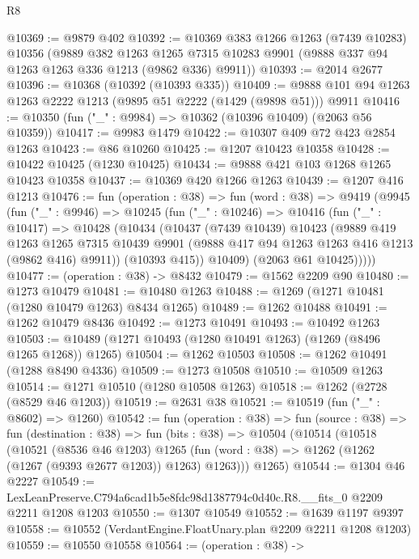 \begin{lexlean}{R8}
\begin{coremodule}
@10369 := @9879 @402
@10392 := @10369
    @383
    @1266
    @1263
    (@7439 @10283)
    @10356
    (@9889
      @382
      @1263
      @1265
      @7315
      @10283
      @9901
      (@9888 @337 @94 @1263 @1263 @336 @1213 (@9862 @336) @9911))
@10393 := @2014 @2677
@10396 := @10368 (@10392 (@10393 @335))
@10409 := @9888 @101 @94 @1263 @1263 @2222 @1213 (@9895 @51 @2222 (@1429 (@9898 @51))) @9911
@10416 := @10350 (fun ("_" : @9984) => @10362 (@10396 @10409) (@2063 @56 @10359))
@10417 := @9983 @1479
@10422 := @10307 @409 @72 @423 @2854 @1263
@10423 := @86 @10260
@10425 := @1207 @10423 @10358
@10428 := @10422 @10425 (@1230 @10425)
@10434 := @9888 @421 @103 @1268 @1265 @10423 @10358
@10437 := @10369 @420 @1266 @1263
@10439 := @1207 @416 @1213
@10476 := fun (operation : @38) =>
  fun (word : @38) =>
  @9419
    (@9945
      (fun ("_" : @9946) =>
      @10245
        (fun ("_" : @10246) =>
        @10416
          (fun ("_" : @10417) =>
          @10428
            (@10434
              (@10437
                (@7439 @10439)
                @10423
                (@9889
                  @419
                  @1263
                  @1265
                  @7315
                  @10439
                  @9901
                  (@9888 @417 @94 @1263 @1263 @416 @1213 (@9862 @416) @9911))
                (@10393 @415))
              @10409)
            (@2063 @61 @10425)))))
@10477 := (operation : @38) -> @8432
@10479 := @1562 @2209 @90
@10480 := @1273 @10479
@10481 := @10480 @1263
@10488 := @1269 (@1271 @10481 (@1280 @10479 @1263) @8434 @1265)
@10489 := @1262 @10488
@10491 := @1262 @10479 @8436
@10492 := @1273 @10491
@10493 := @10492 @1263
@10503 := @10489 (@1271 @10493 (@1280 @10491 @1263) (@1269 (@8496 @1265 @1268)) @1265)
@10504 := @1262 @10503
@10508 := @1262 @10491 (@1288 @8490 @4336)
@10509 := @1273 @10508
@10510 := @10509 @1263
@10514 := @1271 @10510 (@1280 @10508 @1263)
@10518 := @1262 (@2728 (@8529 @46 @1203))
@10519 := @2631 @38
@10521 := @10519 (fun ("_" : @8602) => @1260)
@10542 := fun (operation : @38) =>
  fun (source : @38) =>
  fun (destination : @38) =>
  fun (bits : @38) =>
  @10504
    (@10514
      (@10518
        (@10521
          (@8536 @46 @1203)
          @1265
          (fun (word : @38) => @1262 (@1262 (@1267 (@9393 @2677 @1203)) @1263) @1263)))
      @1265)
@10544 := @1304 @46 @2227
@10549 := LexLeanPreserve.C794a6cad1b5e8fdc98d1387794c0d40c.R8.__fits_0 @2209 @2211 @1208 @1203
@10550 := @1307 @10549
@10552 := @1639 @1197 @9397
@10558 := @10552 (VerdantEngine.FloatUnary.plan @2209 @2211 @1208 @1203)
@10559 := @10550 @10558
@10564 := (operation : @38) ->

\end{coremodule}
\end{lexlean}
